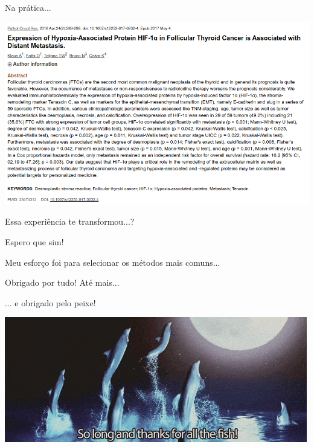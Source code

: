 \documentclass{beamer}
\begin{document}
\begin{frame}[label=exemplo-varios]{\scriptsize Na prática...}
  \begin{center}
    \includegraphics[width=\textwidth]{Cap37-38/exemplo-varios}
  \end{center}
\end{frame}

\begin{frame}{\scriptsize }
  \begin{center}
    Essa experiência te transformou...?

    \bigskip
    \bigskip
    \footnotesize
  \end{center}
\end{frame}

\begin{frame}{\scriptsize }
  \begin{center}
    Espero que sim!

    \bigskip
    {\footnotesize Meu esforço foi para selecionar os métodos mais comuns...}

    \vfill
  \end{center}
\end{frame}

\begin{frame}{\scriptsize }
  \begin{center}
    Obrigado por tudo! Até mais...

    \bigskip
    ... e obrigado pelo peixe!
    \bigskip
    \bigskip

    \includegraphics[height=0.4\textheight]{Encerramento/thanksfish}
    \vfill
  \end{center}
\end{frame}
\end{document}
